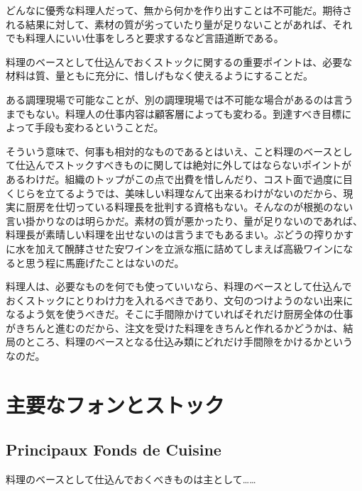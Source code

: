 どんなに優秀な料理人だって、無から何かを作り出すことは不可能だ。期待さ
れる結果に対して、素材の質が劣っていたり量が足りないことがあれば、それ
でも料理人にいい仕事をしろと要求するなど言語道断である。

料理のベースとして仕込んでおくストックに関するの重要ポイントは、必要な
材料は質、量ともに充分に、惜しげもなく使えるようにすることだ。

ある調理現場で可能なことが、別の調理現場では不可能な場合があるのは言う
までもない。料理人の仕事内容は顧客層によっても変わる。到達すべき目標に
よって手段も変わるということだ。

そういう意味で、何事も相対的なものであるとはいえ、こと料理のベースとし
て仕込んでストックすべきものに関しては絶対に外してはならないポイントが
あるわけだ。組織のトップがこの点で出費を惜しんだり、コスト面で過度に目
くじらを立てるようでは、美味しい料理なんて出来るわけがないのだから、現
実に厨房を仕切っている料理長を批判する資格もない。そんなのが根拠のない
言い掛かりなのは明らかだ。素材の質が悪かったり、量が足りないのであれば、
料理長が素晴しい料理を出せないのは言うまでもあるまい。ぶどうの搾りかす
に水を加えて醗酵させた安ワインを立派な瓶に詰めてしまえば高級ワインにな
ると思う程に馬鹿げたことはないのだ。

料理人は、必要なものを何でも使っていいなら、料理のベースとして仕込んで
おくストックにとりわけ力を入れるべきであり、文句のつけようのない出来に
なるよう気を使うべきだ。そこに手間隙かけていればそれだけ厨房全体の仕事
がきちんと進むのだから、注文を受けた料理をきちんと作れるかどうかは、結
局のところ、料理のベースとなる仕込み類にどれだけ手間隙をかけるかという
なのだ。

\hypertarget{ux4e3bux8981ux306aux30d5ux30a9ux30f3ux3068ux30b9ux30c8ux30c3ux30af}{%
\section{主要なフォンとストック}\label{ux4e3bux8981ux306aux30d5ux30a9ux30f3ux3068ux30b9ux30c8ux30c3ux30af}}

\hypertarget{principaux-fonds-de-cuisine}{%
\subsection{Principaux Fonds de
Cuisine}\label{principaux-fonds-de-cuisine}}

料理のベースとして仕込んでおくべきものは主として\ldots{}\ldots{}

